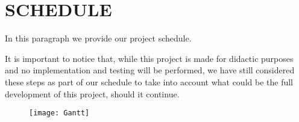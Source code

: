 \section{SCHEDULE}
In this paragraph we provide our project schedule. 

It is important to notice that, while this project is made for didactic purposes and no implementation and testing will be performed, we have still considered these steps as part of our schedule to take into account what could be the full development of this project, should it continue.

\begin{figure}[H]
	\centering
	\texttt{[image: Gantt]}
\end{figure}
